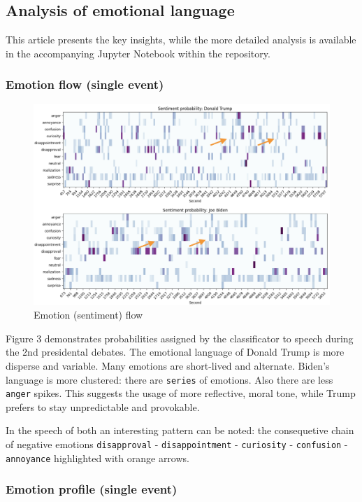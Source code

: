 \documentclass[pdflatex,sn-mathphys-num]{sn-jnl}%
\begin{document}
\subsection{Analysis of emotional language}
This article presents the key insights, while the more detailed analysis is available in the accompanying Jupyter Notebook within the repository.

\subsubsection{Emotion flow (single event)}

\begin{figure}[h]
	\centering
	\includegraphics[width=13cm]{f3-emotion_flow.png}
	\caption{Emotion (sentiment)  flow}
\end{figure}

Figure 3 demonstrates probabilities assigned by the classificator to speech during the 2nd presidental debates.
The emotional language of Donald Trump is more disperse and variable. Many emotions are short-lived and alternate.
Biden's language is more clustered: there are \texttt{series} of emotions. Also there are less \texttt{anger} spikes. This suggests the usage of more reflective, moral tone, while Trump prefers to stay unpredictable and provokable.

In the speech of both an interesting pattern can be noted: the consequetive chain of negative emotions \texttt{disapproval} - \texttt{disappointment} - \texttt{curiosity} - \texttt{confusion} - \texttt{annoyance} highlighted with orange arrows.

\subsubsection{Emotion profile (single event)}
\end{document}

